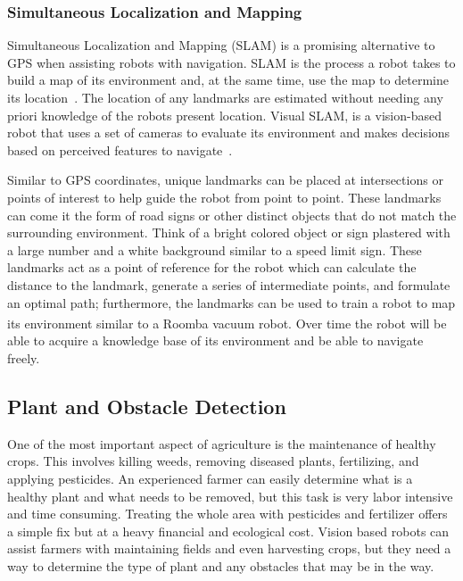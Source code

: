\documentclass[12pt]{article}
\begin{document}
\subsubsection{Simultaneous Localization and Mapping}

Simultaneous Localization and Mapping (SLAM) is a promising alternative to GPS when assisting robots with navigation. SLAM is the process a robot takes to build a map of its environment and, at the same time, use the map to determine its location~\cite{durrant2006simultaneous}. The location of any landmarks are estimated without needing any priori knowledge of the robots present location. Visual SLAM, is a vision-based robot that uses a set of cameras to evaluate its environment and makes decisions based on perceived features to navigate~\cite{gul2019comprehensive}. 

Similar to GPS coordinates, unique landmarks can be placed at intersections or points of interest to help guide the robot from point to point. These landmarks can come it the form of road signs or other distinct objects that do not match the surrounding environment. Think of a bright colored object or sign plastered with a large number and a white background similar to a speed limit sign. These landmarks act as a point of reference for the robot which can calculate the distance to the landmark, generate a series of intermediate points, and formulate an optimal path; furthermore, the landmarks can be used to train a robot to map its environment similar to a Roomba\textsuperscript{\tiny\textregistered} vacuum robot. Over time the robot will be able to acquire a knowledge base of its environment and be able to navigate freely.

\subsection{Plant and Obstacle Detection}
One of the most important aspect of agriculture is the maintenance of healthy crops. This involves killing weeds, removing diseased plants, fertilizing, and applying pesticides. An experienced farmer can easily determine what is a healthy plant and what needs to be removed, but this task is very labor intensive and time consuming. Treating the whole area with pesticides and fertilizer offers a simple fix but at a heavy financial and ecological cost. Vision based robots can assist farmers with maintaining fields and even harvesting crops, but they need a way to determine the type of plant and any obstacles that may be in the way. 
\end{document}
